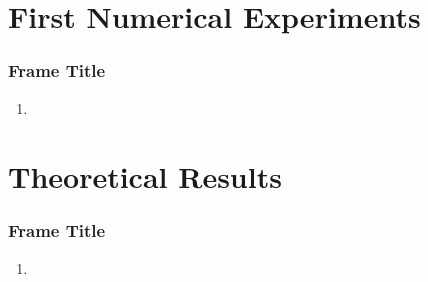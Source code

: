 \documentclass[aspectratio=169,xcolor=dvipsnames,11pt]{beamer}
\begin{document}
 
 \section{First Numerical Experiments}
 \begin{frame}\frametitle{Frame Title}
        \begin{enumerate}
    	\item
    \end{enumerate}
 \end{frame}
 
  \section{Theoretical Results}
 \begin{frame}\frametitle{Frame Title}
        \begin{enumerate}
    	\item
    \end{enumerate}
 \end{frame}
\end{document}
